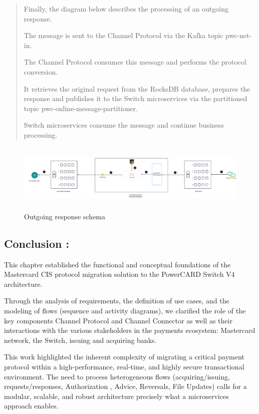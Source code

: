 \documentclass[12pt,a4paper]{report}
\begin{document}
\begin{quote}
Finally, the diagram below describes the processing of an outgoing
response.

The message is sent to the Channel Protocol via the Kafka topic
pwc-net-in.

The Channel Protocol consumes this message and performs the protocol
conversion.

It retrieves the original request from the RocksDB database, prepares
the response and publishes it to the Switch microservices via the
partitioned topic pwc-online-message-partitioner.

Switch microservices consume the message and continue business
processing.
\end{quote}

\begin{figure}[H]
\centering
\includegraphics[width=6.72766in,height=1.29849in]{media/image60.png}
\caption{Outgoing response schema}
\label{fig:ORS}
\end{figure} 
\clearpage

\subsection{Conclusion :}

This chapter established the functional and conceptual foundations of
the Mastercard CIS protocol migration solution to the PowerCARD Switch
V4 architecture.

Through the analysis of requirements, the definition of use cases, and
the modeling of flows (sequence and activity diagrams), we clarified the
role of the key components Channel Protocol and Channel Connector as
well as their interactions with the various stakeholders in the payments
ecosystem: Mastercard network, the Switch, issuing and acquiring banks.

This work highlighted the inherent complexity of migrating a critical
payment protocol within a high-performance, real-time, and highly secure
transactional environment. The need to process heterogeneous flows
(acquiring/issuing, requests/responses, Authorization , Advice,
Reversals, File Updates) calls for a modular, scalable, and robust
architecture precisely what a microservices approach enables.
\end{document}
